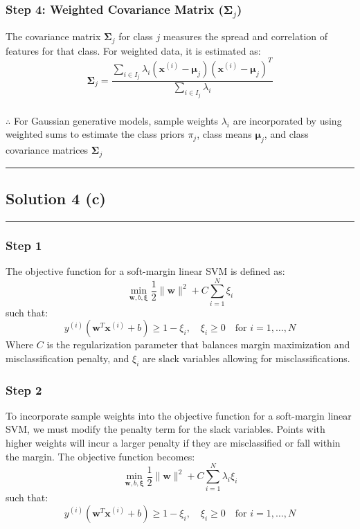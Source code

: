 \documentclass{article}
\begin{document}
\subsubsection*{Step 4: Weighted Covariance Matrix ($\boldsymbol{\Sigma}_j$)}
\parbox{\textwidth}{
The covariance matrix $\boldsymbol{\Sigma}_j$ for class $j$ measures the spread and correlation of features for that class. For weighted data, it is estimated as:
$$ \boldsymbol{\Sigma}_j = \frac{\sum_{i \in I_j} \lambda_i (\mathbf{x}^{(i)} - \boldsymbol{\mu}_j)(\mathbf{x}^{(i)} - \boldsymbol{\mu}_j)^T}{\sum_{i \in I_j} \lambda_i} $$
}

\subsubsection*{\normalfont}{$\therefore$ For Gaussian generative models, sample weights $\lambda_i$ are incorporated by using weighted sums to estimate the class priors $\pi_j$, class means $\boldsymbol{\mu}_j$, and class covariance matrices $\boldsymbol{\Sigma}_j$}

\noindent\rule{\textwidth}{0.4pt}

\newpage

\subsection*{Solution 4 (c)}
\noindent\rule{\textwidth}{0.4pt}

\subsubsection*{Step 1}
\parbox{\textwidth}{
The objective function for a soft-margin linear SVM is defined as:
$$ \min_{\mathbf{w}, b, \boldsymbol{\xi}} \frac{1}{2} \|\mathbf{w}\|^2 + C \sum_{i=1}^{N} \xi_i $$
such that:
$$ y^{(i)}(\mathbf{w}^T \mathbf{x}^{(i)} + b) \ge 1 - \xi_i, \quad \xi_i \ge 0 \quad \text{for } i=1, \ldots, N $$
Where $C$ is the regularization parameter that balances margin maximization and misclassification penalty, and $\xi_i$ are slack variables allowing for misclassifications.
}

\subsubsection*{Step 2}
\parbox{\textwidth}{
To incorporate sample weights into the objective function for a soft-margin linear SVM, we must modify the penalty term for the slack variables. Points with higher weights will incur a larger penalty if they are misclassified or fall within the margin. The objective function becomes:
$$ \min_{\mathbf{w}, b, \boldsymbol{\xi}} \frac{1}{2} \|\mathbf{w}\|^2 + C \sum_{i=1}^{N} \lambda_i \xi_i $$
such that:
$$ y^{(i)}(\mathbf{w}^T \mathbf{x}^{(i)} + b) \ge 1 - \xi_i, \quad \xi_i \ge 0 \quad \text{for } i=1, \ldots, N $$
}
\end{document}
